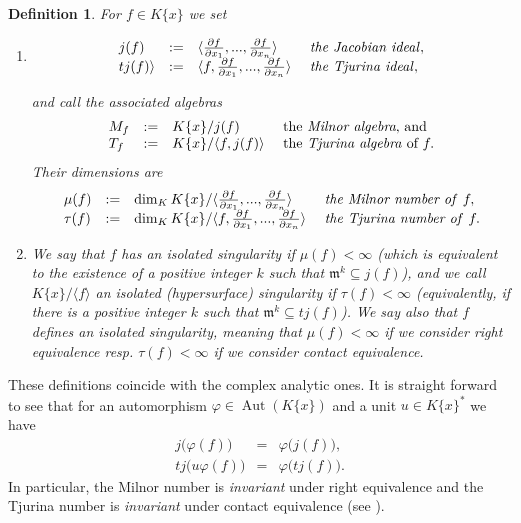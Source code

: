 \documentclass[11pt]{article}
\DeclareMathOperator{\Aut}{Aut}
\newtheorem{Definition}{Definition}[section]
\newcommand{\fm}{\mathfrak{m}}
\begin{document}
\begin{Definition}\label{def:mu_pos}
For  $ f\in K\{x\}$ we set
\begin{enumerate}
\item 
 $$
 \begin{array} {llll}  
  j(f) & :=& \langle\frac {\partial f}{\partial x_1},...,\frac {\partial f}{\partial x_n}\rangle &\text{ \emph{the Jacobian ideal}},\\
tj(f)\rangle & :=& \langle f, \frac {\partial f}{\partial x_1},...,\frac {\partial f}{\partial x_n}\rangle &\text{ \emph{the Tjurina ideal}},
\end{array}  
$$

and call the associated algebras  {
 $$
 \begin{array} {llll}  
 M_f & :=& K\{x\}/j(f)
   &\text{ the \emph{Milnor algebra}, and  }\\
   T_f&:=&K\{x\}/\langle f, j(f) \rangle
   &\text{ the \emph{Tjurina algebra}  of } f.
\end{array}  
 $$ }
   Their dimensions are
$$
 \begin{array} {lllll}  
  \mu(f) & :=& \dim_K K\{x\}/ \langle\frac {\partial f}{\partial x_1},...,\frac {\partial f}{\partial x_n}\rangle\index{Milnor!number} &\text{ \emph{the Milnor number of }} f,\\
 \tau(f) & :=& \dim_K K\{x\}/\langle f, \frac {\partial f}{\partial x_1},...,\frac {\partial f}{\partial x_n}\rangle \index{Tjurina!number}&\text{ \emph{the Tjurina number of }} f.
 \index{$\mu$@$\mu(f)$}\index{$\tau$@$\tau(f)$}
\end{array}  
$$
\item We say that $f$ has an
   \emph{isolated singularity} if $\mu(f)<\infty$ (which is 
   equivalent to the existence of a positive integer $k$ such that
   $\fm^k\subseteq j(f)$),  and we
call $K\{x\}/\langle f\rangle$  an \emph{isolated (hypersurface) singularity} if
   $\tau(f)<\infty$ (equivalently, if there is a positive integer $k$
   such that $\fm^k\subseteq tj(f)$).  We say also that $f$ {\em defines an isolated singularity}, meaning that $\mu(f)<\infty$ if we consider right equivalence  resp.  $\tau(f)<\infty$ if we consider contact equivalence.
   \end{enumerate}
   \end{Definition}

   These definitions coincide with the complex analytic ones. It is straight forward to see
   that for an automorphism $\varphi\in\Aut(K\{x\})$ and a unit
   $u\in K\{x\}^*$ we have {
 $$
\begin{array}{llll}
    j\big(\varphi(f)\big)&=&\varphi\big(j(f)\big), \\
     tj\big(u\varphi(f)\big)&=&\varphi(tj(f)\big).
 \end{array}
 $$}
   In particular, the Milnor number is \emph{invariant} under right equivalence and
   the Tjurina number is \emph{invariant} under contact equivalence (see \cite[Lemma  1.2.10]{GLS25}). 
   
\end{document}
